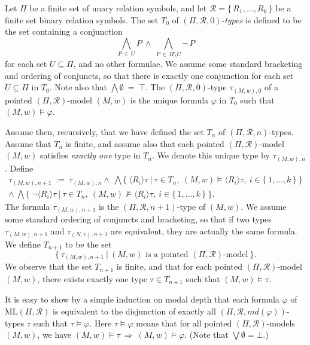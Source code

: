 \documentclass[copyright,creativecommons]{eptcs}
\begin{document}
Let $\Pi$ be a finite set of unary relation symbols, and let
$\mathcal{R}=\{\, R_1,...,R_k\, \}$ be a finite set binary relation symbols.
The set $T_0$ of $(\Pi,\mathcal{R},0)$-\emph{types} 
is defined to be the set containing a conjunction 
$$\bigwedge\limits_{P\, \in\, U} P\ \wedge\ \bigwedge\limits_{P\, \in\, \Pi\setminus U}\neg\, P$$
for each set $U\subseteq\Pi$, and no other formulae. We assume some standard bracketing and ordering of
conjuncts, so that there is exactly one conjunction for each set $U\subseteq\Pi$ in $T_0$. Note also
that $\bigwedge\emptyset\ =\ \top$. The $(\Pi,\mathcal{R},0)$-type $\tau_{(M,w),0}$
of a pointed $(\Pi,\mathcal{R})$-model $(M,w)$ is the unique formula $\varphi$ in $T_0$
such that $(M,w)\models\varphi$.




Assume then, recursively, that we have defined the set $T_{n}$ of $(\Pi,\mathcal{R},n)$-types.
Assume that $T_{n}$ is finite, and
assume also that each pointed $(\Pi,\mathcal{R})$-model $(M,w)$ satisfies \emph{exactly one} type in $T_n$.
We denote this unique type by $\tau_{(M,w),n}$. Define
\begin{multline*}
\tau_{(M,w),n+1}\ :=\ \tau_{(M,w),n} \wedge\ \bigwedge\{\ \langle R_i\rangle \tau\ |\
\tau\in T_n,\ (M,w)\models\langle R_i\rangle \tau,\ i\in\{\, 1,...,k\, \}\ \}\\
\wedge\ \bigwedge\{\ \neg\langle R_i\rangle \tau\ |\ \tau\in T_n,\ (M,w)\not\models\langle R_i\rangle\tau,
\ i\in\{\, 1,...,k\, \}\ \}.
\end{multline*}
The formula $\tau_{(M,w),n+1}$ is the $(\Pi,\mathcal{R},n+1)$-type of $(M,w)$. We assume some
standard ordering of conjuncts and bracketing, so that if two types $\tau_{(M,w),n+1}$ and $\tau_{(N,v),n+1}$
are equivalent, they are actually the same formula. We define $T_{n+1}$ to be the set 
$$\{\ \tau_{(M,w),n+1}\ |\ (M,w)\text{ is a pointed }(\Pi,\mathcal{R})\text{-model}\ \}.$$
We observe that the set $T_{n+1}$ is finite, and that for each pointed $(\Pi,\mathcal{R})$-model $(M,w)$, there exists
exactly one type $\tau\in T_{n+1}$ such that $(M,w)\models\tau$.




It is easy to show by a simple induction on modal
depth that each formula $\varphi$ of $\mathrm{ML}(\Pi,\mathcal{R})$
is equivalent to the disjunction of
exactly all $(\Pi,\mathcal{R},\mathit{md}(\varphi))$-types $\tau$ such that $\tau\models\varphi$.
Here $\tau\models\varphi$ means that for all pointed $(\Pi,\mathcal{R})$-models $(M,w)$, 
we have $(M,w)\models\tau\ \Rightarrow\ (M,w)\models\varphi$. (Note that $\bigvee\emptyset = \bot$.)
\end{document}
